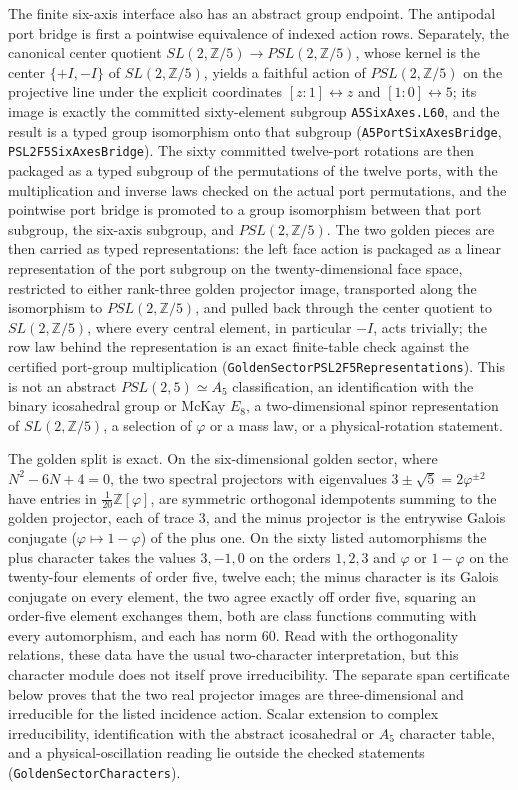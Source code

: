 \documentclass[11pt]{article}
\begin{document}
The finite six-axis interface also has an abstract group endpoint.  The
antipodal port bridge is first a pointwise equivalence of indexed action
rows.  Separately, the canonical center quotient
\(SL(2,\mathbb Z/5)\to PSL(2,\mathbb Z/5)\), whose kernel is the center
\(\{+I,-I\}\) of \(SL(2,\mathbb Z/5)\), yields a faithful action of
\(PSL(2,\mathbb Z/5)\) on the projective line under the explicit coordinates
\([z:1]\leftrightarrow z\) and \([1:0]\leftrightarrow5\); its image is exactly
the committed sixty-element subgroup \texttt{A5SixAxes.L60}, and the
result is a typed group isomorphism onto that subgroup
(\texttt{A5PortSixAxesBridge},
\texttt{PSL2F5SixAxesBridge}).  The sixty committed
twelve-port rotations are then packaged as a typed subgroup of the
permutations of the twelve ports, with the multiplication and inverse laws
checked on the actual port permutations, and the pointwise port bridge is
promoted to a group isomorphism between that port subgroup, the six-axis
subgroup, and \(PSL(2,\mathbb Z/5)\).  The two golden pieces are then
carried as typed representations: the left face action is packaged as a
linear representation of the port subgroup on the twenty-dimensional face
space, restricted to either rank-three golden projector image, transported
along the isomorphism to \(PSL(2,\mathbb Z/5)\), and pulled back through
the center quotient to \(SL(2,\mathbb Z/5)\), where every central element,
in particular \(-I\), acts trivially; the row law behind the representation
is an exact finite-table check against the certified port-group
multiplication (\texttt{GoldenSectorPSL2F5Representations}).
This is not an abstract \(PSL(2,5)\simeq A_5\) classification, an
identification with the binary icosahedral group or McKay \(E_8\), a
two-dimensional spinor representation of \(SL(2,\mathbb Z/5)\), a
selection of \(\varphi\) or a mass law, or a physical-rotation statement.

The golden split is exact. On the six-dimensional golden sector, where
\(N^2-6N+4=0\), the two spectral projectors with eigenvalues
\(3\pm\sqrt5=2\varphi^{\pm2}\) have entries in \(\tfrac1{20}\mathbb Z[\varphi]\),
are symmetric orthogonal idempotents summing to the golden projector, each
of trace \(3\), and the minus projector is the entrywise Galois conjugate
(\(\varphi\mapsto1-\varphi\)) of the plus one. On the sixty listed
automorphisms the plus character takes the values \(3,-1,0\) on the orders
\(1,2,3\) and \(\varphi\) or \(1-\varphi\) on the twenty-four elements of
order five, twelve each; the minus character is its Galois conjugate on
every element, the two agree exactly off order five, squaring an order-five
element exchanges them, both are class functions commuting with every
automorphism, and each has norm \(60\). Read with the orthogonality
relations, these data have the usual two-character interpretation, but this
character module does not itself prove irreducibility. The separate span
certificate below proves that the two real projector images are
three-dimensional and irreducible for the listed incidence action. Scalar
extension to complex irreducibility, identification with the abstract
icosahedral or \(A_5\) character table, and a physical-oscillation reading
lie outside the checked statements
(\texttt{GoldenSectorCharacters}).
\end{document}
